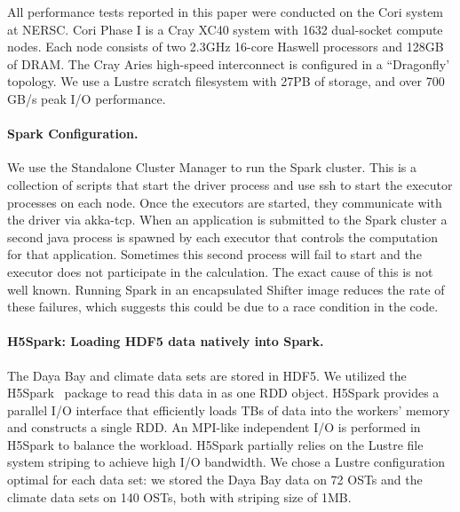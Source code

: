 All performance tests reported in this paper were conducted on the Cori system at NERSC. Cori Phase I is a Cray XC40 system with 1632 dual-socket compute nodes. Each node consists of two 2.3GHz 16-core Haswell processors and 128GB of DRAM. The Cray Aries high-speed interconnect is configured in a ``Dragonfly' topology. We use a Lustre scratch filesystem with 27PB of storage, and over 700 GB/s peak I/O performance. 

\paragraph{Spark Configuration.}
We use the Standalone Cluster Manager to run the Spark cluster. This is a collection of scripts that start the driver process and use ssh to start the executor processes on each node. Once the executors are started, they communicate with the driver via akka-tcp. When an application is submitted to the Spark cluster a second java process is spawned by each executor that controls the computation for that application. Sometimes this second process will fail to start and the executor does not participate in the calculation. The exact cause of this is not well known. Running Spark in an encapsulated Shifter image reduces the rate of these failures, which suggests this could be due to a race condition in the code.

\paragraph{H5Spark: Loading HDF5 data natively into Spark.}
The Daya Bay and climate data sets are stored in HDF5. We utilized the H5Spark~\cite{h5spark-cug16} package to read this data in as one RDD object. H5Spark provides a parallel I/O interface that efficiently loads TBs of data into the workers' memory and constructs a single RDD. An MPI-like independent I/O is performed in H5Spark to balance the workload. H5Spark partially relies on the Lustre file system striping to achieve high I/O bandwidth. We chose a Lustre configuration optimal for each data set: we stored the Daya Bay data on 72 OSTs and the climate data sets on 140 OSTs, both with striping size of 1MB. 

